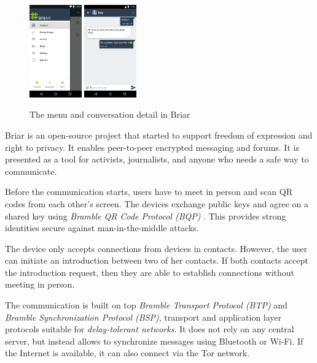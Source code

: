 \documentclass[conference,compsoc]{IEEEtran}
\begin{document}
\begin{figure}[h]
  \centering
  \includegraphics[width=0.2\textwidth]{briar1}
  \includegraphics[width=0.2\textwidth]{briar2}
  \caption{The menu and conversation detail in Briar \cite{briar_gplay}}
\end{figure}

Briar \cite{briar_gplay} is an open-source project that started to support freedom of expression and right to privacy. It enables peer-to-peer encrypted messaging and forums. It is presented as a tool for activists, journalists, and anyone who needs a safe way to communicate.

Before the communication starts, users have to meet in person and scan QR codes from each other's screen. The devices exchange public keys and agree on a shared key using \textit{Bramble QR Code Protocol (BQP)} \cite{briar_bqp}. 
This provides strong identities secure against man-in-the-middle attacks.

The device only accepts connections from devices in contacts. However, the user can initiate an introduction between two of her contacts. If both contacts accept the introduction request, then they are able to establish connections without meeting in person.

The communication is built on top \textit{Bramble Transport Protocol (BTP)} and \textit{Bramble Synchronization Protocol (BSP)}, transport and application layer protocols suitable for \textit{delay-tolerant networks}. \cite{briar_stack} It does not rely on any central server, but instead allows to synchronize messages using Bluetooth or Wi-Fi. If the Internet is available, it can also connect via the Tor network.
\end{document}
